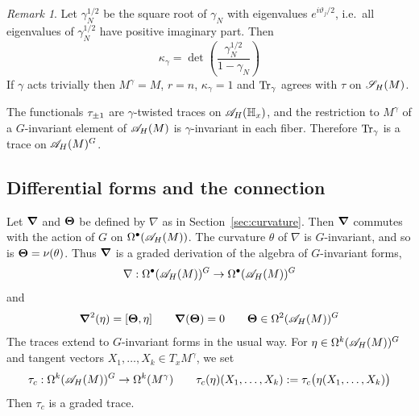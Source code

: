 \documentclass[11pt]{amsart}
\theoremstyle{plain}
\theoremstyle{definition}
\theoremstyle{remark}
\newtheorem{remark}[theorem]{Remark}
\begin{document}
\begin{remark}
Let $\gamma_N^{1/2}$ be the square root of $\gamma_N$ with eigenvalues $e^{i\vartheta_j/2}$, i.e.\ all eigenvalues of $\gamma_N^{1/2}$ have positive imaginary part. Then
\[ \kappa_\gamma = \det\left(\frac{\gamma_N^{1/2}}{1-\gamma_N}\right)\]
If $\gamma$ acts trivially then $M^\gamma=M$, $r=n$, $\kappa_\gamma=1$ and $\operatorname{Tr}_\gamma$ agrees with $\tau$ on ${\mathscr{S}_H}(M)$.
\end{remark}

The functionals $\tau_{\pm1}$ are $\gamma$-twisted traces on ${\mathscr{A}}_H(\mathbb{H}_x)$, and the restriction to $M^\gamma$ of a $G$-invariant element of ${\mathscr{A}}_H(M)$ is $\gamma$-invariant in each fiber.
Therefore $\operatorname{Tr}_\gamma$ is a trace on ${\mathscr{A}}_H(M)^G$.

\subsection{Differential forms and the connection}\label{sec:Tr_gamma forms}

Let $\boldsymbol{\nabla}$ and $\boldsymbol{\Theta}$ be defined by $\nabla$ as in Section~\ref{sec:curvature}.
Then $\boldsymbol{\nabla}$ commutes with the action of $G$ on $\Omega^\bullet({\mathscr{A}}_H(M))$.
The curvature $\theta$ of $\nabla$ is $G$-invariant, and so is $\boldsymbol{\Theta}=\nu(\theta)$.
Thus $\boldsymbol{\nabla}$ is a graded derivation of the algebra  of $G$-invariant forms, 
\[ \nabla: \Omega^\bullet({\mathscr{A}}_H(M))^G\to \Omega^\bullet({\mathscr{A}}_H(M))^G\]
and
\[ \boldsymbol{\nabla}^2(\eta)=[\boldsymbol{\Theta},\eta]\qquad \boldsymbol{\nabla}(\boldsymbol{\Theta})=0\qquad \boldsymbol{\Theta}\in\Omega^2({\mathscr{A}}_H(M))^G\]
The traces extend to $G$-invariant forms in the usual way.
For  $\eta\in\Omega^k({\mathscr{A}}_H(M))^G$ and tangent vectors $X_1,\dots,X_k\in T_xM^\gamma$, we set
\[\tau_{c}:\Omega^k({\mathscr{A}}_H(M))^G\to\Omega^k(M^\gamma)\qquad \tau_{c}(\eta)(X_1,\dots,X_k):=\tau_{c}\bigl(\eta(X_1,\dots,X_k)\bigr)\]
Then $\tau_c$ is a graded trace.
\end{document}
